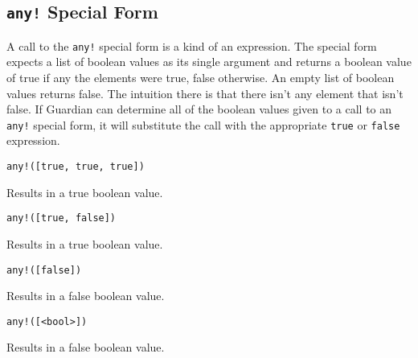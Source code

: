 
\subsection{\texttt{any!} Special Form}
{
	A call to the \texttt{any!} special form is a kind of an expression.
	The special form expects a list of boolean values as its
	single argument and returns a boolean value of true if any the elements
	were true, false otherwise. An empty list of boolean values returns false.
	The intuition there is that there isn't any element that isn't false.
	If Guardian can determine all of the boolean values given to a call to an
	\texttt{any!} special form, it will substitute the call with the
	appropriate \texttt{true} or \texttt{false} expression.
	
	\begin{itemize}
	{
		\item \texttt{any!([true, true, true])}
		
			Results in a true boolean value.
		
		\item \texttt{any!([true, false])}
		
			Results in a true boolean value.
		
		\item \texttt{any!([false])}
		
			Results in a false boolean value.
		
		\item \texttt{any!([<bool>])}
		
			Results in a false boolean value.
	}
	\end{itemize}
}
